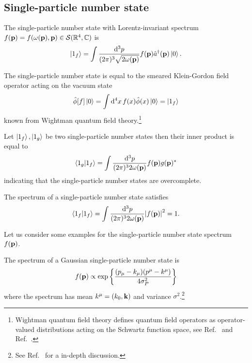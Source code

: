 \subsection{Single-particle number state}

\begin{definition}\label{def:single_particle_number_state}
	The single-particle number state with Lorentz-invariant spectrum $f(\vb{p})=f(\omega(\vb{p}),\vb{p})\in\mathcal{S}(\mathbb{R}^4,\mathbb{C})$ is
	\begin{equation}
		\ket{1_f}
		=
		\int\frac{\dd[3]{p}}{(2\pi)^3\sqrt{2\omega(\vb{p})}}
		f(\vb{p})
		\hat{a}^\dagger(\vb{p})
		\ket{0}
		.
	\end{equation}
\end{definition}
\begin{lemma}\label{thm:single_particle_number_state_smeared_kg}
	The single-particle number state is equal to the smeared Klein-Gordon field operator acting on the vacuum state
	\begin{equation}
		\hat\phi[f]
		\ket{0}
		=
		\int\dd[4]{x}
		f(x)
		\hat\phi(x)
		\ket{0}
		=
		\ket{1_f}
	\end{equation}
	known from Wightman quantum field theory.\footnote{Wightman quantum field theory defines quantum field operators as operator-valued distributions acting on the Schwartz function space, see Ref.~\cite{Bogolubov1989} and Ref.~\cite{Streater2016}.}
\end{lemma}
\begin{lemma}\label{th:single_particle_number_states_inner_product}
	Let $\ket{1_f},\ket{1_g}$ be two single-particle number states then their inner product is equal to
	\begin{equation}
		\braket{1_g}{1_f}
		=
		\int\frac{\dd[3]{p}}{(2\pi)^32\omega(\vb{p})}
		f(\vb{p})g(\vb{p})^*
	\end{equation}
	indicating that the single-particle number states are overcomplete.
\end{lemma}
\begin{lemma}\label{thm:single_particle_number_state_normalization}
	The spectrum of a single-particle number state satisfies
	\begin{equation}
		\bra{1_f}\ket{1_f}
		=
		\int\frac{\dd[3]{p}}{(2\pi)^32\omega(\vb{p})}
		\abs{f(\vb{p})}^2
		=
		1
		.
	\end{equation}
\end{lemma}
Let us consider some examples for the single-particle number state spectrum $f(\vb{p})$.
\begin{example}
	The spectrum of a Gaussian single-particle number state is
	\begin{equation}
		f(\vb{p})
		\propto
		\exp\left\{
			\frac{(p_\mu-k_\mu)(p^\mu-k^\mu)}{4\sigma_P^2}
		\right\}
		\label{eq:covariant_gaussian_spectrum}
	\end{equation}
	where the spectrum has mean $k^\mu=(k_0,\vb{k})$ and variance $\sigma^2$.\footnote{See Ref.~\cite{Naumov2013,Naumov2009} for a in-depth discussion.}
\end{example}
